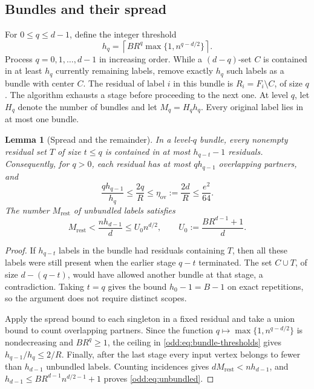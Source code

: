 \documentclass[letterpaper,11pt]{article}
\newtheorem{lemma}[theorem]{Lemma}
\theoremstyle{definition}
\begin{document}
\subsection{Bundles and their spread}

For $0\leq q\leq d-1$, define the integer threshold
\begin{equation}\label{odd:eq:bundle-thresholds}
 h_q=\left\lceil BR^q\max\{1,n^{q-d/2}\}\right\rceil.
\end{equation}
Process $q=0,1,\ldots,d-1$ in increasing order.  While a $(d-q)$-set
$C$ is contained in at least $h_q$ currently remaining labels, remove
exactly $h_q$ such labels as a bundle with center $C$.  The residual of
label $i$ in this bundle is $R_i=F_i\setminus C$, of size $q$.  The
algorithm exhausts a stage before proceeding to the next one.  At level
$q$, let $H_q$ denote the number of bundles and let $M_q=H_qh_q$.
Every original label lies in at most one bundle.

\begin{lemma}[Spread and the remainder]\label{odd:lem:spread}
In a level-$q$ bundle, every nonempty residual set $T$ of size $t\leq q$
is contained in at most $h_{q-t}-1$ residuals.  Consequently, for $q>0$,
each residual has at most $qh_{q-1}$ overlapping partners, and
\begin{equation}\label{odd:eq:overlap}
 \frac{qh_{q-1}}{h_q}\leq\frac{2q}{R}
 \leq\eta_{\mathrm{ov}}:=\frac{2d}{R}\leq\frac{e^2}{64}.
\end{equation}
The number $M_{\mathrm{rest}}$ of unbundled labels satisfies
\begin{equation}\label{odd:eq:unbundled}
 M_{\mathrm{rest}}<\frac{nh_{d-1}}d
 \leq U_0n^{d/2},\qquad
 U_0:=\frac{BR^{d-1}+1}{d}.
\end{equation}
\end{lemma}

\begin{proof}
If $h_{q-t}$ labels in the bundle had residuals containing $T$, then all
these labels were still present when the earlier stage $q-t$ terminated.
The set $C\cup T$, of size $d-(q-t)$, would have allowed another bundle
at that stage, a contradiction.  Taking $t=q$ gives the bound
$h_0-1=B-1$ on exact repetitions, so the argument does not require
distinct scopes.

Apply the spread bound to each singleton in a fixed residual and take a
union bound to count overlapping partners.  Since the function
$q\mapsto\max\{1,n^{q-d/2}\}$ is nondecreasing and $BR^q\geq1$,
the ceiling in \eqref{odd:eq:bundle-thresholds} gives
$h_{q-1}/h_q\leq2/R$.  Finally, after the last stage every input vertex
belongs to fewer than $h_{d-1}$ unbundled labels.  Counting incidences
gives $dM_{\mathrm{rest}}<nh_{d-1}$, and
$h_{d-1}\leq BR^{d-1}n^{d/2-1}+1$ proves
\eqref{odd:eq:unbundled}.
\end{proof}
\end{document}
